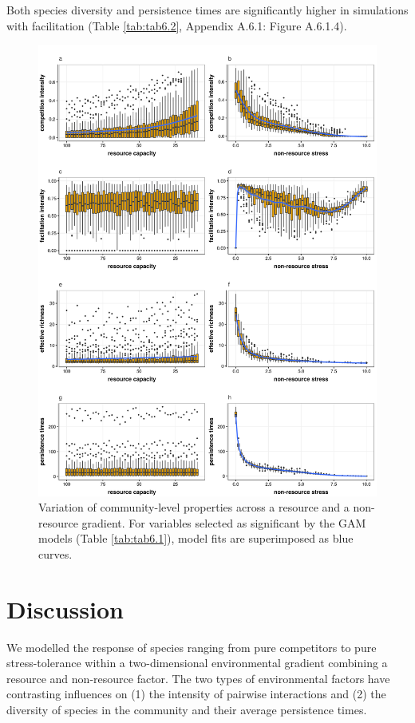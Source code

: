 Both species diversity and persistence times are significantly higher in simulations with facilitation (Table \ref{tab:tab6.2}, Appendix A.6.1: Figure A.6.1.4).

\begin{figure}[ht]
\includegraphics[width=\textwidth]{./Figures/chapter06/Fig_2.png}
\caption[Community responses to gradients]{\color{Gray} Variation of community-level properties across a resource and a non-resource gradient. For variables selected as significant by the GAM models (Table \ref{tab:tab6.1}), model fits are superimposed as blue curves.}
\label{fig:fig6.2}
\end{figure}

\section{Discussion}

We modelled the response of species ranging from pure competitors to pure stress-tolerance within a two-dimensional environmental gradient combining a resource and non-resource factor. The two types of environmental factors have contrasting influences on (1) the intensity of pairwise interactions and (2) the diversity of species in the community and their average persistence times.

